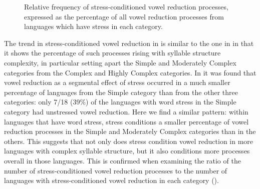   
\begin{figure}
\caption{\label{fig:6.3}Relative frequency of stress-conditioned vowel reduction processes, expressed as the percentage of all vowel reduction processes from languages which have stress in each category.}
\end{figure}

  The trend in stress-conditioned vowel reduction in  is similar to the one in  in that it shows the percentage of such processes rising with syllable structure complexity, in particular setting apart the Simple and Moderately Complex categories from the Complex and Highly Complex categories. In  it was found that vowel reduction as a segmental effect of stress occurred in a much smaller percentage of languages from the Simple category than from the other three categories: only 7/18 (39\%) of the languages with word stress in the Simple category had unstressed vowel reduction. Here we find a similar pattern: within languages that have word stress, stress conditions a smaller percentage of vowel reduction processes in the Simple and Moderately Complex categories than in the others. This suggests that not only does stress condition vowel reduction in more languages with complex syllable structure, but it also conditions more processes overall in those languages. This is confirmed when examining the ratio of the number of stress-conditioned vowel reduction processes to the number of languages with stress-conditioned vowel reduction in each category ().

